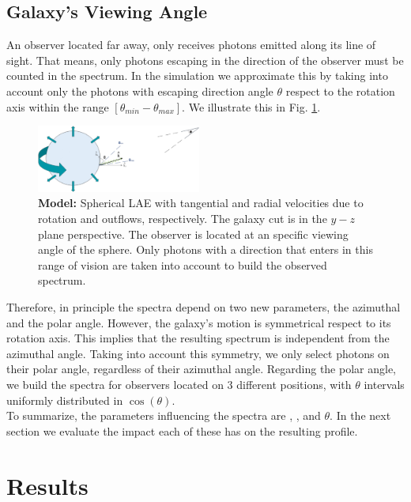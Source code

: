 \documentclass[twocolappendix]{latex/emulateapj}
\begin{document}
\subsection{Galaxy's Viewing Angle}
An observer located far away, only receives photons emitted along its line of sight. That means, only photons escaping in the direction of the observer must be counted in the spectrum. In the simulation we approximate this by taking into account only the photons with escaping direction angle $\theta$ respect to the rotation axis within the range $[\theta_{min}-\theta_{max}]$. We illustrate this in Fig. \ref{fig:model}. \\

\begin{figure}[h!]
	\begin{center}
		\includegraphics[width=0.48\textwidth]{./figures/model}
	\end{center}
	\caption{\textbf{Model:} Spherical LAE with tangential and radial velocities due to rotation and outflows, respectively. The galaxy cut is in the $y-z$ plane perspective. The observer is located at an specific viewing angle of the sphere. Only photons with a direction that enters in this range of vision are taken into account to build the observed spectrum.
		\label{fig:model}}
\end{figure}

Therefore, in principle the spectra depend on two new parameters, the azimuthal and the polar angle. However, the galaxy's motion is symmetrical respect to its rotation axis. This implies that the resulting spectrum is independent from the azimuthal angle. Taking into account this symmetry, we only select photons on their polar angle, regardless of their azimuthal angle. Regarding the polar angle, we build the spectra for observers located on 3 different positions, with $\theta$ intervals uniformly distributed in $\cos(\theta)$. \\ 

To summarize, the parameters influencing the spectra are \vrot, \vout, \tauh and $\theta$. In the next section we evaluate the impact each of these has on the resulting profile. \\


\section{Results}
\label{sec:results}
\end{document}
